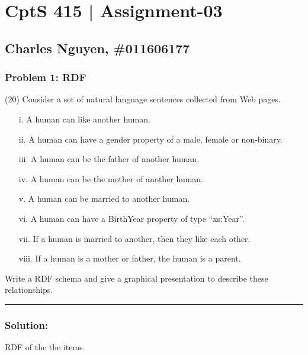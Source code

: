 \documentclass[12pt,letterpaper]{article}
\begin{document}
\section*{CptS 415 | Assignment-03 }
\subsection*{Charles Nguyen, \#011606177 }

\subsubsection*{Problem 1: \textbf{RDF}}
(20) Consider a set of natural language sentences collected from Web pages.

\begin{enumerate}
    \item[i.    ] A human can like another human.
    \item[ii.   ] A human can have a gender property of a male, female or non-binary.
    \item[iii.  ] A human can be the father of another human.
    \item[iv.   ] A human can be the mother of another human.
    \item[v.    ] A human can be married to another human.
    \item[vi.   ] A human can have a BirthYear property of type “xs:Year”.
    \item[vii.  ] If a human is married to another, then they like each other.
    \item[viii. ] If a human is a mother or father, the human is a parent.
\end{enumerate}

Write a RDF schema and give a graphical presentation to describe these
relationships.

\hrule
\subsubsection*{Solution:}
RDF of the the items.
\end{document}
